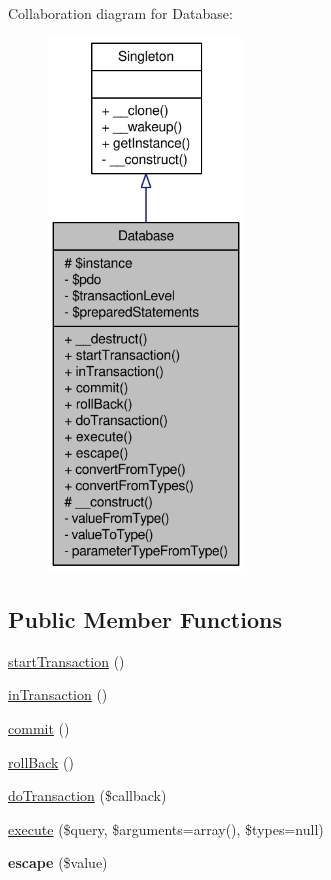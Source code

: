 Collaboration diagram for Database:\nopagebreak
\begin{figure}[H]
\begin{center}
\leavevmode
\includegraphics[height=400pt]{classDatabase__coll__graph}
\end{center}
\end{figure}
\subsection*{Public Member Functions}
\begin{DoxyCompactItemize}
\item 
\hyperlink{classDatabase_a4107b10d54447fc4be287c878ff6faa0}{startTransaction} ()
\item 
\hyperlink{classDatabase_a8eb4ff36e5aee14fea7e1956b53dea9d}{inTransaction} ()
\item 
\hyperlink{classDatabase_a2903b6c9ff18c27ce43fb79558bbcfee}{commit} ()
\item 
\hyperlink{classDatabase_af41c84a1d533c8c650322e128112df34}{rollBack} ()
\item 
\hyperlink{classDatabase_a3ac67d2c28767d5c6d66db12d3568d7c}{doTransaction} (\$callback)
\item 
\hyperlink{classDatabase_a1a7d690c71fa3e350cb69fa33e7a8995}{execute} (\$query, \$arguments=array(), \$types=null)
\item 
\hypertarget{classDatabase_a49c18a3525e0ecfe4eb6727be719e0b3}{
{\bfseries escape} (\$value)}
\label{classDatabase_a49c18a3525e0ecfe4eb6727be719e0b3}

\end{DoxyCompactItemize}
